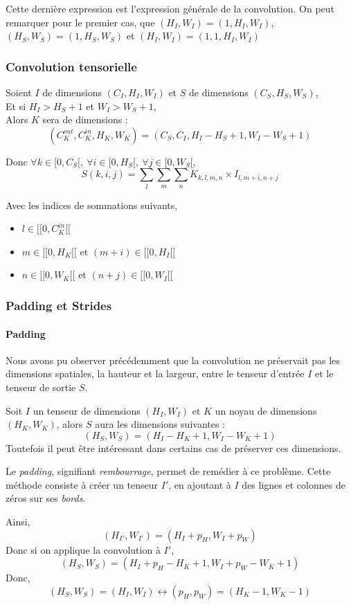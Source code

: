 \documentclass[a4paper, 10pt]{report}
\begin{document}
Cette dernière expression est l'expression générale de la convolution.
On peut remarquer pour le premier cas, que $(H_I,W_I) = (1, H_I,W_I)$, $(H_S,W_S) = (1, H_S,W_S)$ et $(H_I,W_I) = (1, 1,  H_I,W_I)$

\subsubsection{Convolution tensorielle}
Soient $I$ de dimensions $(C_I, H_I,W_I)$ et $S$ de dimensions $(C_S, H_S, W_S)$,\\
Et si $H_I > H_S + 1$ et $W_I > W_S + 1$,\\
Alors $K$ sera de dimensions :
$$(C_K^{out}, C_K^{in}, H_K, W_K) = (C_S, C_I, H_I - H_S + 1, W_I - W_S + 1)$$

Donc $\forall k \in [0, C_S[, \ \forall i \in [0, H_S[, \ \forall j \in [0, W_S[$,
$$S(k,i,j) = \sum_{l}\sum_{m}\sum_{n}{K_{k,l,m,n} \times I_{l,m + i, n + j}}$$

Avec les indices de sommations suivants,
\begin{itemize}
	\item $l \in [\![0, C_K^{in}[\![$
	\item $m \in [\![0, H_K[\![$ et $(m + i) \in [\![0, H_I[\![$
	\item $n \in [\![0, W_K[\![$ et $(n + j) \in [\![0, W_I[\![$
\end{itemize}
\subsubsection{Padding et Strides}
\paragraph{Padding}
Nous avons pu observer précédemment que la convolution ne préservait pas les dimensions spatiales, la hauteur et la largeur, entre le tenseur d'entrée $I$ et le tenseur de sortie $S$.

Soit $I$ un tenseur de dimensions $(H_I, W_I)$ et $K$ un noyau de dimensions $(H_K, W_K)$, alors $S$ aura les dimensions suivantes :
$$(H_S, W_S) = (H_I - H_K + 1, W_I - W_K + 1)$$
Toutefois il peut être intéressant dans certains cas de préserver ces dimensions.

Le \emph{padding}, signifiant \emph{rembourrage}, permet de remédier à ce problème. Cette méthode consiste à créer un tenseur $I'$, en ajoutant à $I$ des lignes et colonnes de zéros sur ses \emph{bords}.

Ainsi, $$(H_{I'}, W_{I'}) = (H_I + p_H, W_I + p_W)$$
Donc si on applique la convolution à $I'$,
$$(H_S, W_S) = (H_I + p_H - H_K + 1, W_I + p_W - W_K + 1)$$
Donc,
$$(H_S, W_S) = (H_I, W_I) \leftrightarrow (p_H, p_W) = (H_K - 1, W_K - 1) $$
\end{document}
